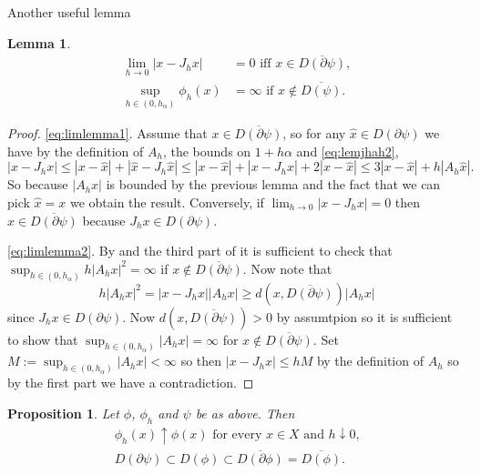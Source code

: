 \documentclass[a4paper,11pt, leqno]{scrreprt} %
\renewcommand{\leq}{\leqslant}
\renewcommand{\leq}{\leqslant}
\renewcommand{\geq}{\geqslant}
\theoremstyle{change}
\newcounter{acounter}[chapter]
\newtheorem{lemma}[acounter]{Lemma}
\newtheorem{proposition}[acounter]{Proposition}
\theoremstyle{nonumberplain}
\newtheorem{proof}{Proof}
\begin{document}
Another useful lemma
\begin{lemma}\label{lem:limlemma}
  \begin{align}
    \label{eq:limlemma1}
    \lim_{h \to 0} |x - J_h x| &= 0 \text{ iff $x \in
      \overline{D(\partial \psi)}$},\\
    \label{eq:limlemma2}
    \sup_{h \in (0, h_\alpha)} \phi_h(x) &= \infty \text{ if $x \notin \overline{D(\psi)}$}.
  \end{align}
\end{lemma}
\begin{proof}
  \eqref{eq:limlemma1}. Assume that $x \in \overline{D(\partial
    \psi)}$, so for any $\hat x \in D(\partial \psi)$ we have by the
  definition of $A_h$, the bounds on $1 + h \alpha$ and
  \eqref{eq:lemjhah2},
  \begin{equation*}
    |x - J_h x| \leq |x - \hat x| + |\hat x - J_h \hat x| \leq |x -
    \hat x| + |x - J_h \hat x| + 2|x - \hat x| \leq 3 |x - \hat x| +
    h|A_h \hat x|.
  \end{equation*}
  So because $|A_h x|$ is bounded by the previous lemma and the fact
  that we can pick $\hat x = x$ we obtain the result. Conversely, if
  $\lim_{h \to 0} |x - J_h x| = 0$ then $x \in \overline{D(\partial
    \psi)}$ because $J_h x \in D(\partial \psi)$.

  \eqref{eq:limlemma2}. By  and the third part of
   it is sufficient to check that\\ \mbox{$\sup_{h \in
    (0, h_\alpha)} h |A_h x|^2 = \infty$} if $x \notin
  \overline{D(\partial \psi)}$. Now note that
  \begin{equation*}
    h |A_h x|^2 = |x - J_h x| |A_h x| \geq d(x, \overline{D(\partial
      \psi)}) |A_h x|
  \end{equation*}
  since $J_h x \in D(\partial \psi)$. Now $d(x, \overline{D(\partial
      \psi)}) > 0$ by assumtpion so it is sufficient to show that
    $\sup_{h \in (0, h_\alpha)} |A_h x| = \infty$ for $x \notin
    \overline{D(\partial \psi)}$. Set $M := \sup_{h \in (0, h_\alpha)}
    |A_h x| < \infty$ so then $|x - J_h x| \leq h M$ by the definition
    of $A_h$ so by the first part we have a contradiction.
\end{proof}

\begin{proposition}
  Let $\phi$, $\phi_h$ and $\psi$ be as above. Then
  \begin{align}
    \label{eq:propconvphih1}
    \phi_h(x) \uparrow \phi(x) \text{ for every $x \in X$ and $h
      \downarrow 0$,}\\
    \label{eq:propconvphih2}
    D(\partial \psi) \subset D(\phi) \subset \overline{D(\partial
      \phi)} = \overline{D(\phi)}.
  \end{align}
\end{proposition}
\end{document}
